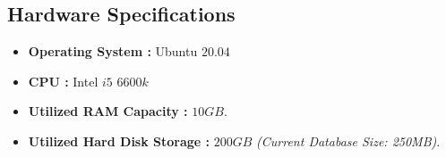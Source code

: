 \begin{enumerate}
\subsection{Hardware Specifications}
\begin{itemize}
    \item \textbf{Operating System :} Ubuntu $20.04$
    \item \textbf{CPU :} Intel $i5$ $6600k$
    \item \textbf{Utilized RAM Capacity :} $10GB$.
    \item \textbf{Utilized Hard Disk Storage :} $200GB$ \emph{(Current Database Size: 250MB)}.
\end{itemize}
\end{enumerate}